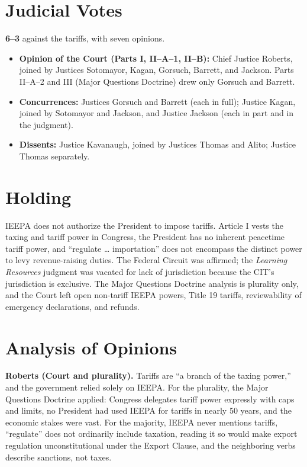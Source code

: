 \documentclass[12pt]{article}
\begin{document}
\section{Judicial Votes}

\textbf{6--3} against the tariffs, with seven opinions.
\begin{itemize}
\item \textbf{Opinion of the Court (Parts I, II--A--1, II--B):} Chief Justice Roberts, joined by Justices Sotomayor, Kagan, Gorsuch, Barrett, and Jackson. Parts II--A--2 and III (Major Questions Doctrine) drew only Gorsuch and Barrett.
\item \textbf{Concurrences:} Justices Gorsuch and Barrett (each in full); Justice Kagan, joined by Sotomayor and Jackson, and Justice Jackson (each in part and in the judgment).
\item \textbf{Dissents:} Justice Kavanaugh, joined by Justices Thomas and Alito; Justice Thomas separately.
\end{itemize}

\section{Holding}

IEEPA does not authorize the President to impose tariffs. Article I vests the taxing and tariff power in Congress, the President has no inherent peacetime tariff power, and ``regulate \ldots{} importation'' does not encompass the distinct power to levy revenue-raising duties. The Federal Circuit was affirmed; the \textit{Learning Resources} judgment was vacated for lack of jurisdiction because the CIT's jurisdiction is exclusive. The Major Questions Doctrine analysis is plurality only, and the Court left open non-tariff IEEPA powers, Title 19 tariffs, reviewability of emergency declarations, and refunds.

\section{Analysis of Opinions}

\textbf{Roberts (Court and plurality).} Tariffs are ``a branch of the taxing power,'' and the government relied solely on IEEPA. For the plurality, the Major Questions Doctrine applied: Congress delegates tariff power expressly with caps and limits, no President had used IEEPA for tariffs in nearly 50 years, and the economic stakes were vast. For the majority, IEEPA never mentions tariffs, ``regulate'' does not ordinarily include taxation, reading it so would make export regulation unconstitutional under the Export Clause, and the neighboring verbs describe sanctions, not taxes.
\end{document}
